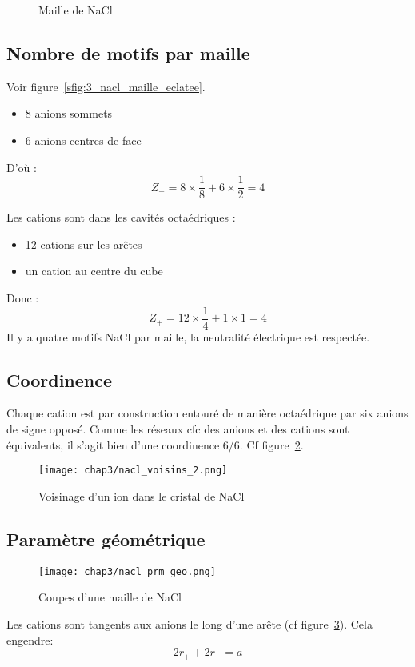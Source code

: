 \begin{figure}
    \centering
    \qquad
    \caption{Maille de NaCl}\label{fig:3_nacl_struct}
\end{figure}


\subsection{Nombre de motifs par maille}
Voir figure~\ref{sfig:3_nacl_maille_eclatee}.
\begin{itemize}
    \item 8 anions sommets
    \item 6 anions centres de face
\end{itemize}
D'où :
\begin{equation}
    Z_- = 8 \times \frac{1}{8} + 6 \times \frac{1}{2} = 4
\end{equation}


Les cations sont dans les cavités octaédriques :
\begin{itemize}
    \item 12 cations sur les arêtes
    \item un cation au centre du cube
\end{itemize}
Donc :
\begin{equation}
    Z_+ = 12 \times \frac{1}{4} + 1 \times 1 = 4
\end{equation}
Il y a quatre motifs NaCl par maille, la neutralité
électrique est respectée.


\subsection{Coordinence}
Chaque cation est par construction entouré de manière octaédrique par six anions
de signe opposé. Comme les réseaux cfc des anions et des cations sont équivalents, il
s'agit bien d’une coordinence 6/6. Cf figure~\ref{fig:3_nacl_voisins}.
\begin{figure}
    \centering
    \texttt{[image: chap3/nacl\_voisins\_2.png]}
    \caption{Voisinage d'un ion dans le cristal de NaCl}
    \label{fig:3_nacl_voisins}
\end{figure}


\subsection{Paramètre géométrique}
\begin{figure}
    \centering
    \texttt{[image: chap3/nacl\_prm\_geo.png]}
    \caption{Coupes d'une maille de NaCl}\label{fig:3_nacl_maille_coupe}
\end{figure}
Les cations sont tangents aux anions le long d'une arête (cf figure~\ref{fig:3_nacl_maille_coupe}).
Cela engendre:
\begin{equation}
    2r_+ + 2r_- = a
    \label{eq:3_nacl_ar}
\end{equation}


